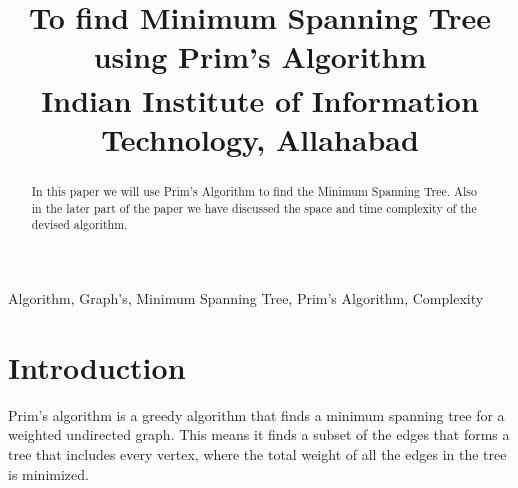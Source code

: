 \documentclass[conference]{IEEEtran}
\begin{document}
\title{To find Minimum Spanning Tree using Prim's Algorithm\\
{\footnotesize \textsuperscript {} Indian Institute of Information Technology, Allahabad}
}

\author{
\and
{}
\and
{}
}

\maketitle

\begin{abstract}
 In this paper we will use Prim's Algorithm to find the Minimum Spanning Tree. Also in the later part of the paper we have discussed the space and time complexity of the devised algorithm.
\end{abstract}

\begin{IEEEkeywords}
Algorithm, Graph's, Minimum Spanning Tree, Prim's Algorithm, Complexity
\end{IEEEkeywords}

\section{Introduction}
Prim's algorithm is a greedy algorithm that finds a minimum spanning tree for a weighted undirected graph. This means it finds a subset of the edges that forms a tree that includes every vertex, where the total weight of all the edges in the tree is minimized. 
\end{document}

